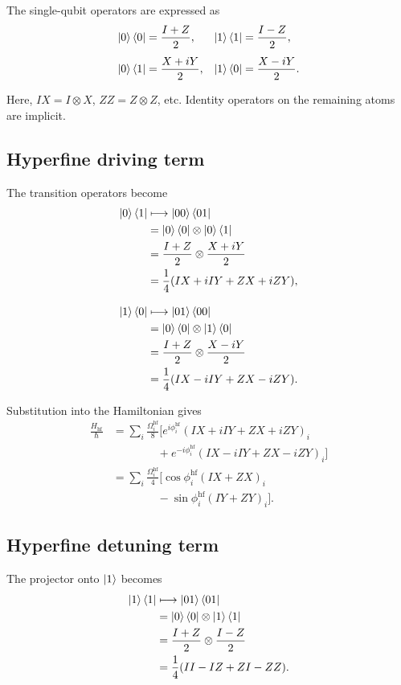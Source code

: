 \documentclass[amssymb,twocolumn,aps]{revtex4-2}
\begin{document}
The single-qubit operators are expressed as
\begin{align*}
    \ket{0}\bra{0} &= \frac{I+Z}{2},
    &\ket{1}\bra{1} &= \frac{I-Z}{2},\\[4pt]
    \ket{0}\bra{1} &= \frac{X+iY}{2},
    &\ket{1}\bra{0} &= \frac{X-iY}{2}.
\end{align*}

Here, $IX=I\otimes X$, $ZZ=Z\otimes Z$, etc.
Identity operators on the remaining atoms are implicit.

\subsection*{Hyperfine driving term}

The transition operators become
\begin{align*}
    \ket{0}\bra{1}
    &\longmapsto \ket{00}\bra{01}\\
    &= \ket{0}\bra{0}\otimes\ket{0}\bra{1}\\
    &= \frac{I+Z}{2}\otimes\frac{X+iY}{2}\\
    &= \frac14(IX+iIY+ZX+iZY),
    \\[8pt]
    \ket{1}\bra{0}
    &\longmapsto \ket{01}\bra{00}\\
    &= \ket{0}\bra{0}\otimes\ket{1}\bra{0}\\
    &= \frac{I+Z}{2}\otimes\frac{X-iY}{2}\\
    &= \frac14(IX-iIY+ZX-iZY).
\end{align*}

Substitution into the Hamiltonian gives
\begin{align*}
    \frac{H_{\mathrm{hf}}}{\hbar}
    &= \sum_i \frac{\Omega_i^{\mathrm{hf}}}{8}
    \Big[
        e^{i\phi_i^{\mathrm{hf}}}
        (IX+iIY+ZX+iZY)_i\\
    &\qquad\qquad
        +e^{-i\phi_i^{\mathrm{hf}}}
        (IX-iIY+ZX-iZY)_i
    \Big]\\[6pt]
    &= \sum_i \frac{\Omega_i^{\mathrm{hf}}}{4}
    \Big[
        \cos\phi_i^{\mathrm{hf}}(IX+ZX)_i\\
    &\qquad\qquad
        -\sin\phi_i^{\mathrm{hf}}(IY+ZY)_i
    \Big].
\end{align*}

\subsection*{Hyperfine detuning term}

The projector onto $\ket{1}$ becomes
\begin{align*}
    \ket{1}\bra{1}
    &\longmapsto \ket{01}\bra{01}\\
    &= \ket{0}\bra{0}\otimes\ket{1}\bra{1}\\
    &= \frac{I+Z}{2}\otimes\frac{I-Z}{2}\\
    &= \frac14(II-IZ+ZI-ZZ).
\end{align*}
\end{document}
